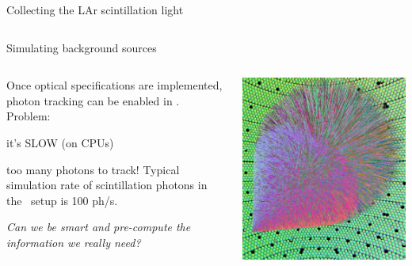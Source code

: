 \documentclass[10pt,aspectratio=169]{beamer}
\begin{document}
\begin{frame}{Collecting the LAr scintillation light}
\begin{columns}
\begin{tikzpicture}
        \end{tikzpicture}
  \end{columns}
\end{frame}
\begin{frame}{Simulating background sources}
  \begin{columns}
    \begin{column}{0.6\textwidth}\setlength{\parskip}{10pt}%
    Once optical specifications are implemented, photon tracking can be enabled
    in \geant. Problem:
    \begin{center}
      \alert{it's SLOW} {\small(on CPUs)}
    \end{center}
    too many photons to track! Typical simulation rate of scintillation photons
    in the \gerda\ setup is \alert{100 ph/s}.

    \emph{Can we be smart and pre-compute the information we really need?}
    \end{column}
    \begin{column}{0.4\textwidth}
      \begin{center}
        \includegraphics[width=\columnwidth]{opticks-shower.png}
      \end{center}
    \end{column}
  \end{columns}
\end{frame}
\end{document}

